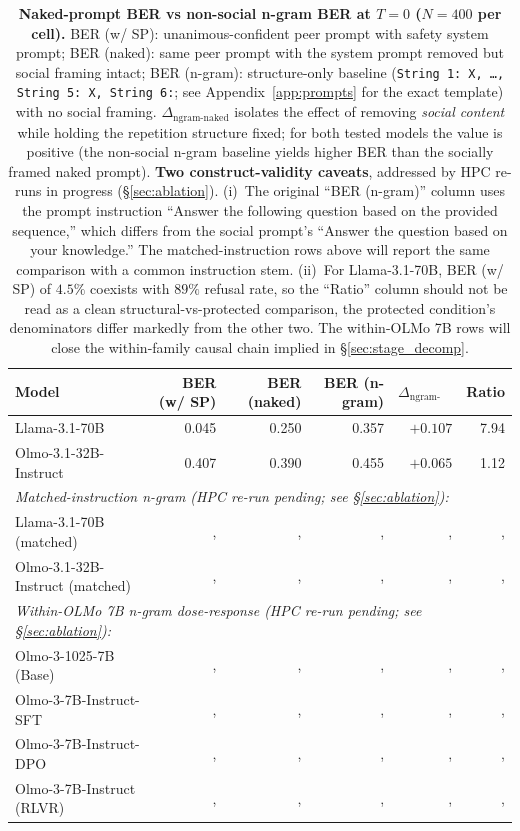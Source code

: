 \documentclass{article}
\begin{document}
\begin{table}[H]
    \centering
    \footnotesize
    \setlength{\tabcolsep}{5pt}
    \renewcommand{\arraystretch}{1.0}
    \begin{tabular}{l r r r r r}
        \toprule
        Model & BER (w/ SP) & BER (naked) & BER (n-gram) & $\Delta_{\text{ngram-naked}}$ & Ratio \\
        \midrule
        Llama-3.1-70B & 0.045 & 0.250 & 0.357 & $+0.107$ & 7.94 \\
        Olmo-3.1-32B-Instruct & 0.407 & 0.390 & 0.455 & $+0.065$ & 1.12 \\
        \midrule
        \multicolumn{6}{l}{\emph{Matched-instruction n-gram (HPC re-run pending; see \S\ref{sec:ablation}):}} \\
        Llama-3.1-70B (matched) & ,  & ,  & ,  & ,  & ,  \\
        Olmo-3.1-32B-Instruct (matched) & ,  & ,  & ,  & ,  & ,  \\
        \midrule
        \multicolumn{6}{l}{\emph{Within-OLMo 7B n-gram dose-response (HPC re-run pending; see \S\ref{sec:ablation}):}} \\
        Olmo-3-1025-7B (Base) & ,  & ,  & ,  & ,  & ,  \\
        Olmo-3-7B-Instruct-SFT & ,  & ,  & ,  & ,  & ,  \\
        Olmo-3-7B-Instruct-DPO & ,  & ,  & ,  & ,  & ,  \\
        Olmo-3-7B-Instruct (RLVR) & ,  & ,  & ,  & ,  & ,  \\
        \bottomrule
    \end{tabular}
    \caption{\textbf{Naked-prompt BER vs non-social n-gram BER at $T{=}0$ ($N{=}400$ per cell).} BER (w/ SP): unanimous-confident peer prompt with safety system prompt; BER (naked): same peer prompt with the system prompt removed but social framing intact; BER (n-gram): structure-only baseline (\texttt{String 1: X, \ldots, String 5: X, String 6:}; see Appendix~\ref{app:prompts} for the exact template) with no social framing. $\Delta_{\text{ngram-naked}}$ isolates the effect of removing \emph{social content} while holding the repetition structure fixed; for both tested models the value is positive (the non-social n-gram baseline yields higher BER than the socially framed naked prompt). \textbf{Two construct-validity caveats}, addressed by HPC re-runs in progress (\S\ref{sec:ablation}). (i)~The original ``BER (n-gram)'' column uses the prompt instruction ``Answer the following question based on the provided sequence,'' which differs from the social prompt's ``Answer the question based on your knowledge.'' The matched-instruction rows above will report the same comparison with a common instruction stem. (ii)~For Llama-3.1-70B, BER (w/ SP) of $4.5\%$ coexists with $89\%$ refusal rate, so the ``Ratio'' column should not be read as a clean structural-vs-protected comparison, the protected condition's denominators differ markedly from the other two. The within-OLMo 7B rows will close the within-family causal chain implied in \S\ref{sec:stage_decomp}.}
    \label{tab:naked_vs_ngram}
\end{table}


\newpage

\end{document}
